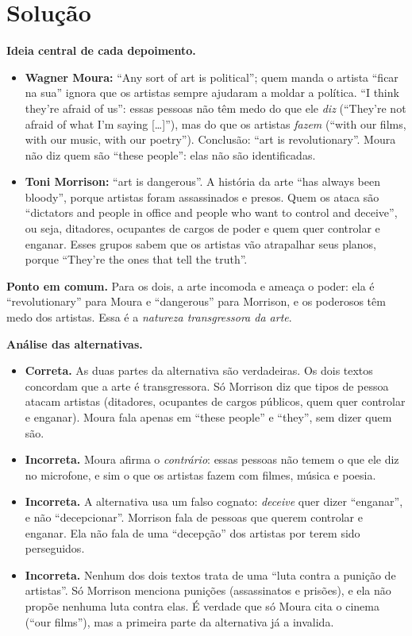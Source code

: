 \documentclass{article}%
\begin{document}
\section*{Solução}

\textbf{Ideia central de cada depoimento.}

\begin{itemize}
\item \textbf{Wagner Moura:} ``Any sort of art is political''; quem manda o artista ``ficar na sua'' ignora que os artistas sempre ajudaram a moldar a política. ``I think they're afraid of us'': essas pessoas não têm medo do que ele \emph{diz} (``They're not afraid of what I'm saying [\ldots]''), mas do que os artistas \emph{fazem} (``with our films, with our music, with our poetry''). Conclusão: ``art is revolutionary''. Moura não diz quem são ``these people'': elas não são identificadas.
\item \textbf{Toni Morrison:} ``art is dangerous''. A história da arte ``has always been bloody'', porque artistas foram assassinados e presos. Quem os ataca são ``dictators and people in office and people who want to control and deceive'', ou seja, ditadores, ocupantes de cargos de poder e quem quer controlar e enganar. Esses grupos sabem que os artistas vão atrapalhar seus planos, porque ``They're the ones that tell the truth''.
\end{itemize}

\textbf{Ponto em comum.} Para os dois, a arte incomoda e ameaça o poder: ela é ``revolutionary'' para Moura e ``dangerous'' para Morrison, e os poderosos têm medo dos artistas. Essa é a \emph{natureza transgressora da arte}.

\textbf{Análise das alternativas.}

\begin{itemize}
\item[a)] \textbf{Correta.} As duas partes da alternativa são verdadeiras. Os dois textos concordam que a arte é transgressora. Só Morrison diz que tipos de pessoa atacam artistas (ditadores, ocupantes de cargos públicos, quem quer controlar e enganar). Moura fala apenas em ``these people'' e ``they'', sem dizer quem são.
\item[b)] \textbf{Incorreta.} Moura afirma o \emph{contrário}: essas pessoas não temem o que ele diz no microfone, e sim o que os artistas fazem com filmes, música e poesia.
\item[c)] \textbf{Incorreta.} A alternativa usa um falso cognato: \emph{deceive} quer dizer ``enganar'', e não ``decepcionar''. Morrison fala de pessoas que querem controlar e enganar. Ela não fala de uma ``decepção'' dos artistas por terem sido perseguidos.
\item[d)] \textbf{Incorreta.} Nenhum dos dois textos trata de uma ``luta contra a punição de artistas''. Só Morrison menciona punições (assassinatos e prisões), e ela não propõe nenhuma luta contra elas. É verdade que só Moura cita o cinema (``our films''), mas a primeira parte da alternativa já a invalida.
\end{itemize}
\end{document}
